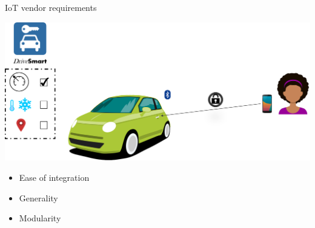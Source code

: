 \begin{frame}{IoT vendor requirements}
    \begin{center}
        \includegraphics[scale=0.33]{Figures/ex_intro.png}
    \end{center}
    
    \begin{multicols}{2}
    \begin{itemize}
        \item Ease of integration
        \item Generality
        \item Modularity
    \end{itemize}
    \end{multicols}
\end{frame}

